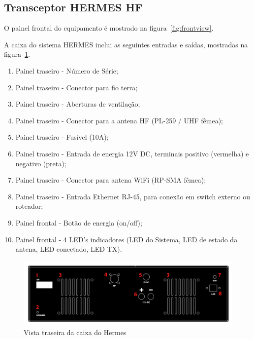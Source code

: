 \documentclass[11pt,a4paper]{article}
\begin{document}
\subsection{Transceptor HERMES HF}

O painel frontal do equipamento é mostrado na figura~\ref{fig:frontview}.

A caixa do sistema HERMES inclui as seguintes entradas e saídas, mostradas na figura~\ref{fig:backview}.

\begin{enumerate}
    \item Painel traseiro - Número de Série;
    \item Painel traseiro - Conector para fio terra;
    \item Painel traseiro - Aberturas de ventilação;
    \item Painel traseiro - Conector para a antena HF (PL-259 / UHF fêmea);
     \item Painel traseiro - Fusível (10A);
    \item Painel traseiro - Entrada de energia 12V DC, terminais positivo (vermelha) e negativo (preta);
    \item Painel traseiro - Conector para antena WiFi (RP-SMA fêmea);
    \item Painel traseiro - Entrada Ethernet RJ-45, para conexão em switch externo ou roteador;
    \item Painel frontal - Botão de energia (on/off);
    \item Painel frontal - 4 LED's indicadores (LED do Sistema, LED de estado da antena, LED conectado, LED TX).
\end{enumerate}

\begin{figure}[!ht]
\includegraphics[width=1\textwidth]{pictures/traseiro.png}
\caption{Vista traseira da caixa do Hermes}
\label{fig:backview}
\end{figure}
\end{document}
